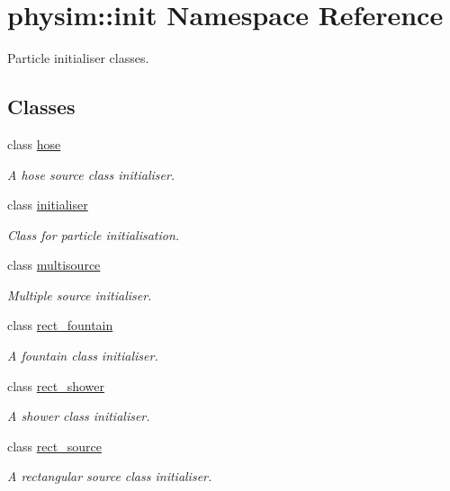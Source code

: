 \hypertarget{namespacephysim_1_1init}{}\section{physim\+:\+:init Namespace Reference}
\label{namespacephysim_1_1init}


Particle initialiser classes.  


\subsection*{Classes}
\begin{DoxyCompactItemize}
\item 
class \hyperlink{classphysim_1_1init_1_1hose}{hose}
\begin{DoxyCompactList}\small\item\em A hose source class initialiser. \end{DoxyCompactList}\item 
class \hyperlink{classphysim_1_1init_1_1initialiser}{initialiser}
\begin{DoxyCompactList}\small\item\em Class for particle initialisation. \end{DoxyCompactList}\item 
class \hyperlink{classphysim_1_1init_1_1multisource}{multisource}
\begin{DoxyCompactList}\small\item\em Multiple source initialiser. \end{DoxyCompactList}\item 
class \hyperlink{classphysim_1_1init_1_1rect__fountain}{rect\+\_\+fountain}
\begin{DoxyCompactList}\small\item\em A fountain class initialiser. \end{DoxyCompactList}\item 
class \hyperlink{classphysim_1_1init_1_1rect__shower}{rect\+\_\+shower}
\begin{DoxyCompactList}\small\item\em A shower class initialiser. \end{DoxyCompactList}\item 
class \hyperlink{classphysim_1_1init_1_1rect__source}{rect\+\_\+source}
\begin{DoxyCompactList}\small\item\em A rectangular source class initialiser. \end{DoxyCompactList}\end{DoxyCompactItemize}
